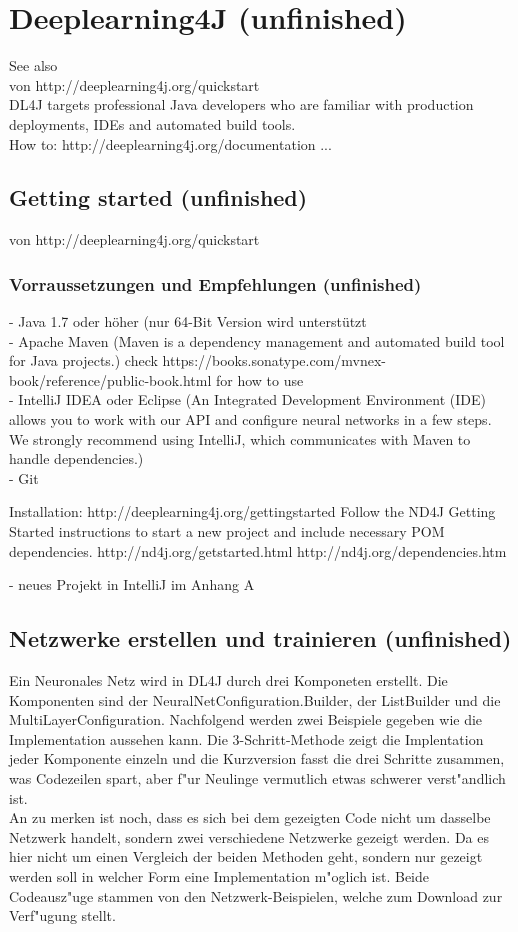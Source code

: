 \chapter{Deeplearning4J (unfinished)}
{See also \cite{DL4J}\\
von http://deeplearning4j.org/quickstart\\
DL4J targets professional Java developers who are familiar with production deployments, IDEs and automated build tools.\\

How to:
http://deeplearning4j.org/documentation
...

\section{Getting started (unfinished)}
von http://deeplearning4j.org/quickstart\\

\subsection{Vorraussetzungen und Empfehlungen (unfinished)}
- Java 1.7 oder höher (nur 64-Bit Version wird unterstützt\\
- Apache Maven (Maven is a dependency management and automated build tool for Java projects.) check https://books.sonatype.com/mvnex-book/reference/public-book.html for how to use\\
- IntelliJ IDEA oder Eclipse (An Integrated Development Environment (IDE) allows you to work with our API and configure neural networks in a few steps. We strongly recommend using IntelliJ, which communicates with Maven to handle dependencies.)\\
- Git

Installation:
http://deeplearning4j.org/gettingstarted
Follow the ND4J Getting Started instructions to start a new project and include necessary POM dependencies.
http://nd4j.org/getstarted.html
http://nd4j.org/dependencies.htm

- neues Projekt in IntelliJ im Anhang A


\section{Netzwerke erstellen und trainieren (unfinished)}
Ein Neuronales Netz wird in DL4J durch drei Komponeten erstellt. Die Komponenten sind der NeuralNetConfiguration.Builder, der ListBuilder und die MultiLayerConfiguration. Nachfolgend werden zwei Beispiele gegeben wie die Implementation aussehen kann. Die 3-Schritt-Methode zeigt die Implentation jeder Komponente einzeln und die Kurzversion fasst die drei Schritte zusammen, was Codezeilen spart, aber f"ur Neulinge vermutlich etwas schwerer verst"andlich ist.\\
An zu merken ist noch, dass es sich bei dem gezeigten Code nicht um dasselbe Netzwerk handelt, sondern zwei verschiedene Netzwerke gezeigt werden. Da es hier nicht um einen Vergleich der beiden Methoden geht, sondern nur gezeigt werden soll in welcher Form eine Implementation m"oglich ist. Beide Codeausz"uge stammen von den Netzwerk-Beispielen, welche \cite{DL4J} zum Download zur Verf"ugung stellt.

}

